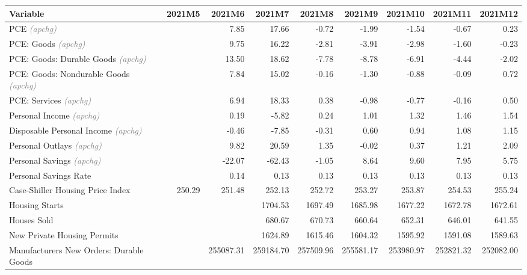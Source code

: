 \documentclass[11pt, letterpaper]{article}\usepackage[]{graphicx}\usepackage[]{color}
\begin{document}
\begin{table}[H]
\centering
\begingroup\fontsize{10pt}{12pt}\selectfont
\begin{tabular}{lrrrrrrrr}
  \hline
Variable & 2021M5 & 2021M6 & 2021M7 & 2021M8 & 2021M9 & 2021M10 & 2021M11 & 2021M12 \\ 
  \hline
PCE \textit{\footnotesize\textcolor{gray}{(apchg)}} &  & 7.85 & 17.66 & -0.72 & -1.99 & -1.54 & -0.67 & 0.23 \\ 
  PCE: Goods \textit{\footnotesize\textcolor{gray}{(apchg)}} &  & 9.75 & 16.22 & -2.81 & -3.91 & -2.98 & -1.60 & -0.23 \\ 
  PCE: Goods: Durable Goods \textit{\footnotesize\textcolor{gray}{(apchg)}} &  & 13.50 & 18.62 & -7.78 & -8.78 & -6.91 & -4.44 & -2.02 \\ 
  PCE: Goods: Nondurable Goods \textit{\footnotesize\textcolor{gray}{(apchg)}} &  & 7.84 & 15.02 & -0.16 & -1.30 & -0.88 & -0.09 & 0.72 \\ 
  PCE: Services \textit{\footnotesize\textcolor{gray}{(apchg)}} &  & 6.94 & 18.33 & 0.38 & -0.98 & -0.77 & -0.16 & 0.50 \\ 
  Personal Income \textit{\footnotesize\textcolor{gray}{(apchg)}} &  & 0.19 & -5.82 & 0.24 & 1.01 & 1.32 & 1.46 & 1.54 \\ 
  Disposable Personal Income \textit{\footnotesize\textcolor{gray}{(apchg)}} &  & -0.46 & -7.85 & -0.31 & 0.60 & 0.94 & 1.08 & 1.15 \\ 
  Personal Outlays \textit{\footnotesize\textcolor{gray}{(apchg)}} &  & 9.82 & 20.59 & 1.35 & -0.02 & 0.37 & 1.21 & 2.09 \\ 
  Personal Savings \textit{\footnotesize\textcolor{gray}{(apchg)}} &  & -22.07 & -62.43 & -1.05 & 8.64 & 9.60 & 7.95 & 5.75 \\ 
  Personal Savings Rate &  & 0.14 & 0.13 & 0.13 & 0.13 & 0.13 & 0.13 & 0.13 \\ 
  Case-Shiller Housing Price Index & 250.29 & 251.48 & 252.13 & 252.72 & 253.27 & 253.87 & 254.53 & 255.24 \\ 
  Housing Starts &  &  & 1704.53 & 1697.49 & 1685.98 & 1677.22 & 1672.78 & 1672.61 \\ 
  Houses Sold &  &  & 680.67 & 670.73 & 660.64 & 652.31 & 646.01 & 641.55 \\ 
  New Private Housing Permits &  &  & 1624.89 & 1615.46 & 1604.32 & 1595.92 & 1591.08 & 1589.63 \\ 
  Manufacturers New Orders: Durable Goods &  & 255087.31 & 259184.70 & 257509.96 & 255581.17 & 253980.97 & 252821.32 & 252082.00 \\ 

\end{tabular}
\end{table}
\end{document}
